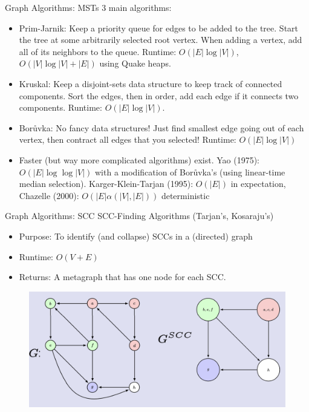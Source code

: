\documentclass{beamer}
\begin{document}
 \begin{frame}[t]{Graph Algorithms: MSTs}
   3 main algorithms:
   \begin{itemize}
       \item \alert{Prim-Jarnik}: Keep a priority queue for edges to be added to the tree. Start the tree at some arbitrarily selected root vertex. When adding a vertex, add all of its neighbors to the queue. Runtime: $O(|E| \log |V|)$, $O(|V| \log |V| + |E|)$ using Quake heaps.
       \item \pause \alert{Kruskal}: Keep a disjoint-sets data structure to keep track of connected components. Sort the edges, then in order, add each edge if it connects two components. Runtime: $O(|E| \log |V|)$.
       \item \pause \alert{Bor\r{u}vka}: No fancy data structures! Just find smallest edge going out of each vertex, then contract all edges that you selected! Runtime: $O(|E| \log |V|)$
       \item \pause Faster (but way more complicated algorithms) exist. \alert{Yao} (1975): $O(|E| \log \log |V|)$ with a modification of Bor\r{u}vka's (using linear-time median selection). \alert{Karger-Klein-Tarjan} (1995): $O(|E|)$ in expectation, \alert{Chazelle} (2000): $O(|E| \alpha(|V|, |E|))$ deterministic
   \end{itemize}
 \end{frame}

\begin{frame}[t]{Graph Algorithms: SCC}
  \alert{SCC-Finding Algorithms (Tarjan's, Kosaraju's)}
  \begin{itemize}
      \item \alert{Purpose:} To identify (and collapse) SCCs in a (directed) graph
      \item \alert{Runtime:} $O(V + E)$
      \item \alert{Returns:} A metagraph that has one node for each SCC.
  \end{itemize}
  \begin{figure}
      \centering
      \includegraphics[width=0.5\linewidth]{SCC.png}
  \end{figure}
\end{frame}
\end{document}
